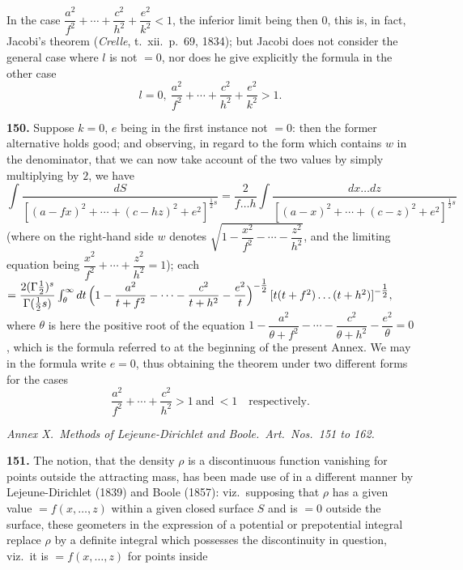 \documentclass[11pt,a4paper]{article}
\begin{document}
In the case $\dfrac{a^{2}}{f^{2}} + \cdots + \dfrac{c^{2}}{h^{2}} + \dfrac{e^{2}}{k^{2}} < 1$, the inferior limit being then $0$, this is, in fact, Jacobi's theorem (\textit{Crelle}, t.\ xii.\ p.~69, 1834); but Jacobi does not consider the general case where $l$ is not $= 0$, nor does he give explicitly the formula in the other case
\[
l = 0,\ \frac{a^{2}}{f^{2}} + \cdots + \frac{c^{2}}{h^{2}} + \frac{e^{2}}{k^{2}} > 1.
\]

\textbf{150.} Suppose $k = 0$, $e$ being in the first instance not $= 0$: then the former alternative holds good; and observing, in regard to the form which contains $w$ in the denominator, that we can now take account of the two values by simply multiplying by $2$, we have
\[
\int \frac{dS}{[(a-fx)^{2}+\cdots+(c-hz)^{2}+e^{2}]^{\tfrac{1}{2}s}} = \frac{2}{f\ldots h}\int \frac{dx\ldots dz}{[(a-x)^{2}+\cdots+(c-z)^{2}+e^{2}]^{\tfrac{1}{2}s}}
\]
(where on the right-hand side $w$ denotes $\sqrt{1 - \dfrac{x^{2}}{f^{2}} - \cdots - \dfrac{z^{2}}{h^{2}}}$, and the limiting equation being $\dfrac{x^{2}}{f^{2}} + \cdots + \dfrac{z^{2}}{h^{2}} = 1$); each $= \dfrac{2(\Gamma\tfrac{1}{2})^{s}}{\Gamma(\tfrac{1}{2}s)}\int_{\theta}^{\infty} dt\,\Bigl(1 - \dfrac{a^{2}}{t+f^{2}} - \cdots - \dfrac{c^{2}}{t+h^{2}} - \dfrac{e^{2}}{t}\Bigr)^{-\tfrac{1}{2}}\,[t(t+f^{2})\ldots(t+h^{2})]^{-\tfrac{1}{2}},$
where $\theta$ is here the positive root of the equation $1 - \dfrac{a^{2}}{\theta+f^{2}} - \cdots - \dfrac{c^{2}}{\theta+h^{2}} - \dfrac{e^{2}}{\theta} = 0$, which is the formula referred to at the beginning of the present Annex. We may in the formula write $e = 0$, thus obtaining the theorem under two different forms for the cases
\[
\frac{a^{2}}{f^{2}} + \cdots + \frac{c^{2}}{h^{2}} > 1\ \text{and}\ < 1\quad \text{respectively.}
\]

\bigskip
\begin{center}
\textit{Annex X.\ Methods of Lejeune-Dirichlet and Boole.\ Art.\ Nos.\ 151 to 162.}
\end{center}

\textbf{151.} The notion, that the density $\rho$ is a discontinuous function vanishing for points outside the attracting mass, has been made use of in a different manner by Lejeune-Dirichlet (1839) and Boole (1857): viz.\ supposing that $\rho$ has a given value $= f(x,\ldots,z)$ within a given closed surface $S$ and is $= 0$ outside the surface, these geometers in the expression of a potential or prepotential integral replace $\rho$ by a definite integral which possesses the discontinuity in question, viz.\ it is $= f(x,\ldots,z)$ for points inside
\end{document}
